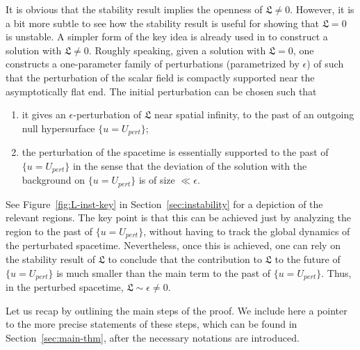 \documentclass[10pt, reqno]{amsart}
\theoremstyle{definition}
\theoremstyle{remark}
\theoremstyle{conjecture}
\numberwithin{equation}{section}
\newcommand{\ep}{\epsilon}
\newcommand{\0}{\emptyset}
\begin{document}
It is obvious that the stability result implies the openness of $\mathfrak L\neq 0$. However, it is a bit more subtle to see how the stability result is useful for showing that $\mathfrak L=0$ is unstable. A simpler form of the key idea is already used in \cite{LO.instab} to construct a solution with $\mathfrak L\neq 0$. Roughly speaking, given a solution with $\mathfrak L=0$, one constructs a one-parameter family of perturbations (parametrized by $\ep$) of such that the perturbation of the scalar field is compactly supported near the asymptotically flat end. The initial perturbation can be chosen such that 
\begin{enumerate}
\item it gives an $\ep$-perturbation of $\mathfrak L$ near spatial infinity, to the past of an outgoing null hypersurface $\{u=U_{pert}\}$;
\item the perturbation of the spacetime is essentially supported to the past of $\{u=U_{pert}\}$ in the sense that the deviation of the solution with the background on $\{u=U_{pert}\}$ is of size $\ll \ep$.
\end{enumerate}
See Figure~\ref{fig:L-inst-key} in Section~\ref{sec:instability} for a depiction of the relevant regions. The key point is that this can be achieved just by analyzing the region to the past of $\{u=U_{pert}\}$, without having to track the global dynamics of the perturbated spacetime. Nevertheless, once this is achieved, one can rely on the stability result of $\mathfrak L$ to conclude that the contribution to $\mathfrak L$ to the future of $\{u=U_{pert}\}$ is much smaller than the main term to the past of $\{u=U_{pert}\}$. Thus, in the perturbed spacetime, $\mathfrak L\sim \ep \neq 0$. 


Let us recap by outlining the main steps of the proof. We include here a pointer to the more precise statements of these steps, which can be found in Section~\ref{sec:main-thm}, after the necessary notations are introduced.
\end{document}

